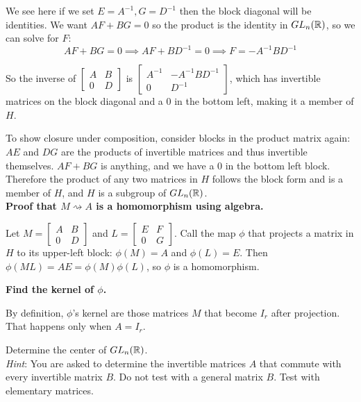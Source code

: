 \documentclass{article}
\begin{document}
We see here if we set $E = A^{-1}, G = D^{-1}$ then the block diagonal will be identities. We want $AF + BG = 0$ so the product is the identity in $GL_n(\mathbb{R})$, so we can solve for $F$:
$$AF + BG = 0 \implies AF + BD^{-1} = 0 \implies F = -A^{-1}BD^{-1}$$

So the inverse of $\begin{bmatrix} A & B \\ 0 & D \end{bmatrix}$ is $\begin{bmatrix} A^{-1} & -A^{-1}BD^{-1} \\ 0 & D^{-1} \end{bmatrix}$, which has invertible matrices on the block diagonal and a 0 in the bottom left, making it a member of $H$.

To show closure under composition, consider blocks in the product matrix again: $AE$ and $DG$ are the products of invertible matrices and thus invertible themselves. $AF + BG$ is anything, and we have a 0 in the bottom left block. Therefore the product of any two matrices in $H$ follows the block form and is a member of $H$, and $H$ is a subgroup of $GL_n(\mathbb{R})$.
\\

\textbf{Proof that $M \rightsquigarrow A$ is a homomorphism using algebra.}

Let $M = \begin{bmatrix} A & B \\ 0 & D \end{bmatrix}$ and $L = \begin{bmatrix} E & F \\ 0 & G \end{bmatrix}$. Call the map $\phi$ that projects a matrix in $H$ to its upper-left block: $\phi(M) = A$ and $\phi(L) = E$. Then $\phi(ML) = AE = \phi(M)\phi(L)$, so $\phi$ is a homomorphism.

\textbf{Find the kernel of $\phi$.}

By definition, $\phi$'s kernel are those matrices $M$ that become $I_r$ after projection. That happens only when $A = I_r$.

\begin{problem}
Determine the center of $GL_n(\mathbb{R})$.
\\

\textit{Hint}: You are asked to determine the invertible matrices $A$ that commute with every invertible matrix $B$. Do not test with a general matrix $B$. Test with elementary matrices.
\end{problem}
\end{document}
